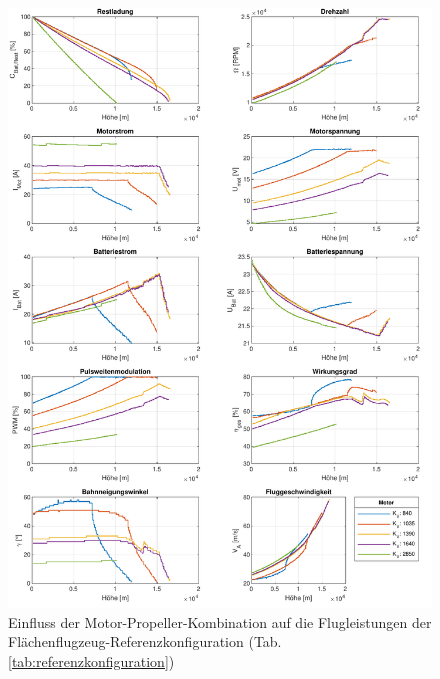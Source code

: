 \begin{figure}[htb!]
\centering
	\includegraphics[scale=0.7]{Diagramme/Flaechenflzg_Mot_Prop.pdf}
	\caption{Einfluss der Motor-Propeller-Kombination auf die Flugleistungen der Flächenflugzeug-Referenzkonfiguration (Tab. \ref{tab:referenzkonfiguration})}
	\label{abb:flaechenflzg_mot_prop}
\end{figure}

